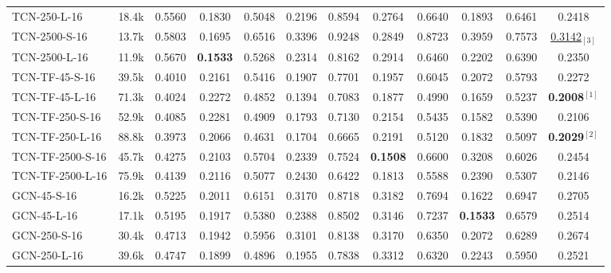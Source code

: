 \begin{table*}[ht!]
{\begin{tabular}{lccc|cc|cc|cc|cc}
            TCN-250-L-16               
                & 18.4k & 0.5560 & 0.1830 & 0.5048 & 0.2196 & 0.8594 & 0.2764 & 0.6640 & 0.1893 & 0.6461 & 0.2418\\
            TCN-2500-S-16               
                & 13.7k & 0.5803 & 0.1695 & 0.6516 & 0.3396 & 0.9248 & 0.2849 & 0.8723 & 0.3959 & 0.7573 & \underline{0.3142}$_{[3]}$\\ 
            TCN-2500-L-16               
                & 11.9k & 0.5670 & \textbf{0.1533} & 0.5268	& 0.2314 & 0.8162 & 0.2914 & 0.6460	& 0.2202 & 0.6390 & 0.2350\\
            \hline
            TCN-TF-45-S-16               
                & 39.5k & 0.4010 & 0.2161 & 0.5416 & 0.1907 & 0.7701 & 0.1957 & 0.6045 & 0.2072 & 0.5793 & 0.2272\\
            TCN-TF-45-L-16               
                & 71.3k & 0.4024 & 0.2272 & 0.4852 & 0.1394 & 0.7083 & 0.1877 & 0.4990 & 0.1659 & 0.5237 & \textbf{0.2008}$^{[1]}$\\
            TCN-TF-250-S-16               
                & 52.9k & 0.4085 & 0.2281 & 0.4909 & 0.1793 & 0.7130 & 0.2154 & 0.5435 & 0.1582 & 0.5390 & 0.2106\\
            TCN-TF-250-L-16               
                & 88.8k & 0.3973 & 0.2066 & 0.4631 & 0.1704 & 0.6665 & 0.2191 & 0.5120 & 0.1832 & 0.5097 & \textbf{0.2029}$^{[2]}$\\
            TCN-TF-2500-S-16               
                & 45.7k & 0.4275 & 0.2103 & 0.5704 & 0.2339 & 0.7524 & \textbf{0.1508} & 0.6600	& 0.3208 & 0.6026 & 0.2454\\
            TCN-TF-2500-L-16               
                & 75.9k & 0.4139 & 0.2116 & 0.5077 & 0.2430 & 0.6422 & 0.1813 & 0.5588 & 0.2390 & 0.5307 & 0.2146\\
            \hline
            GCN-45-S-16               
                & 16.2k & 0.5225 & 0.2011 & 0.6151 & 0.3170 & 0.8718 & 0.3182 & 0.7694 & 0.1622 & 0.6947 & 0.2705\\ 
            GCN-45-L-16               
                & 17.1k & 0.5195 & 0.1917 & 0.5380 & 0.2388 & 0.8502 & 0.3146 & 0.7237 & \textbf{0.1533} & 0.6579 & 0.2514\\
            GCN-250-S-16               
                & 30.4k & 0.4713 & 0.1942 & 0.5956 & 0.3101 & 0.8138 & 0.3170 & 0.6350 & 0.2072 & 0.6289 & 0.2674\\ 
            GCN-250-L-16               
                & 39.6k & 0.4747 & 0.1899 & 0.4896 & 0.1955 & 0.7838 & 0.3312 & 0.6320 & 0.2243 & 0.5950 & 0.2521\\

\end{tabular}}
\end{table*}
